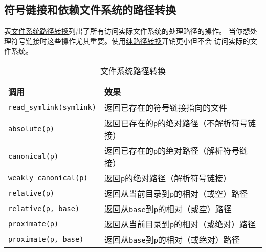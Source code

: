 \subsection{符号链接和依赖文件系统的路径转换}\label{ch20.4.5}
表\hyperref[t20.18]{文件系统路径转换}列出了所有访问实际文件系统的处理路径的操作。
当你想处理符号链接时这些操作尤其重要。使用\hyperref[ch20.3.3]{纯路径转换}开销更小但不会
访问实际的文件系统。
\begin{table}[ht]
    \centering
    \begin{tabular}{l|l}
        \hline
        \textbf{调用}                     & \textbf{效果}                           \\
        \hline
        \texttt{read\_symlink(symlink)} & 返回已存在的符号链接指向的文件                       \\
        \texttt{absolute(p)}            & 返回已存在的\texttt{p}的绝对路径（不解析符号链接）        \\
        \texttt{canonical(p)}           & 返回已存在的\texttt{p}的绝对路径（解析符号链接）         \\
        \texttt{weakly\_canonical(p)}   & 返回\texttt{p}的绝对路径（解析符号链接）             \\
        \texttt{relative(p)}            & 返回从当前目录到\texttt{p}的相对（或空）路径           \\
        \texttt{relative(p, base)}      & 返回从\texttt{base}到\texttt{p}的相对（或空）路径  \\
        \texttt{proximate(p)}           & 返回从当前目录到\texttt{p}的相对（或绝对）路径          \\
        \texttt{proximate(p, base)}     & 返回从\texttt{base}到\texttt{p}的相对（或绝对）路径 \\
        \hline
    \end{tabular}
    \caption{文件系统路径转换}
    \label{t20.18}
\end{table}

